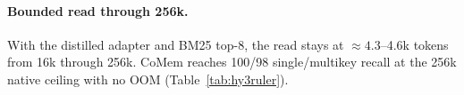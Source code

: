 

\paragraph{Bounded read through 256k.}
With the distilled adapter and BM25 top-8, the read stays at
$\approx4.3$--4.6k tokens from 16k through 256k. CoMem reaches 100/98
single/multikey recall at the 256k native ceiling with no OOM
(Table~\ref{tab:hy3ruler}).


